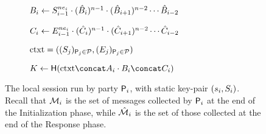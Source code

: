 \begin{figure}
\begin{adjustbox}{varwidth=0.9\textwidth,fbox,center,scale=0.92}
\begin{subfigure}{0.7\linewidth}
\begin{nicodemus}
			\item $\groupesk{i} \gets S_{i-1}^{n\esk_i} \cdot (\tempesk{i})^{n-1} \cdot (\tempesk{i+1})^{n-2} \cdots \tempesk{i-2}$  \\
			\item $\groupeek{i} \gets E_{i-1}^{n\esk_i} \cdot (\tempeek{i})^{n-1} \cdot (\tempeek{i+1})^{n-2} \cdots \tempeek{i-2}$  \\
			\item $\context = ((\spk_j)_{\User[j] \in \PartySet},(\epk_j)_{\User[j] \in \PartySet})$
			\item $K \gets \FSHash (\context \concat \groupsek{i} \cdot \groupesk{i} \concat \groupeek{i})$\\
		\end{nicodemus}
	\end{subfigure}
	\end{adjustbox}
	\caption{The local session run by party $\User[i]$, with static key-pair $(\ssk_i, \spk_i)$. Recall that $\GakeIniMesSet[i]$ is the set of messages collected by $\User[i]$ at the end of the Initialization phase, while $\GakeResMesSet[i]$ is the set of those collected at the end of the Response phase.}
	\label{fig:ourprotocol}
\end{figure}

